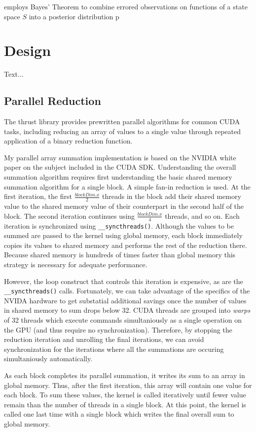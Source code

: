 \documentclass{article}
\begin{document}
 employs Bayes' Theorem to combine errored observations on functions of a state space \(S\) into a posterior distribution p

\section{Design}
Text...
\subsection{Parallel Reduction}
The thrust library provides prewritten parallel algorithms for common CUDA tasks, including reducing an array of values to a single value through repeated application of a binary reduction function.\cite{thrust}

My parallel array summation implementation is based on the NVIDIA white paper on the subject included in the CUDA SDK.\cite{oprc} Understanding the overall summation algorithm requires first understanding the basic shared memory summation algorithm for a single block. A simple fan-in reduction is used. At the first iteration, the first \(\frac{blockDim.x}{2}\) threads in the block add their shared memory value to the shared memory value of their counterpart in the second half of the block. The second iteration continues using \(\frac{blockDim.x}{4}\) threads, and so on. Each iteration is synchronized using \verb!__syncthreads()!. Although the values to be summed are passed to the kernel using global memory, each block immediately copies its values to shared memory and performs the rest of the reduction there. Because shared memory is hundreds of times faster than global memory\cite{tutorial1} this strategy is necessary for adequate performance.

However, the loop construct that controls this iteration is expensive, as are the \verb!__syncthreads()! calls. Fortunately, we can take advantage of the specifics of the NVIDA hardware to get substatial additional savings once the number of values in shared memory to sum drops below 32. CUDA threads are grouped into \emph{warps} of 32 threads which execute commands simultaniously as a single operation on the GPU (and thus require no synchronization). Therefore, by stopping the reduction iteration and unrolling the final iterations, we can avoid synchronization for the iterations where all the summations are occuring simultaniously automatically.

As each block completes its parallel summation, it writes its sum to an array in global memory. Thus, after the first iteration, this array will contain one value for each block. To sum these values, the kernel is called iteratively until fewer value remain than the number of threads in a single block. At this point, the kernel is called one last time with a single block which writes the final overall sum to global memory.
\end{document}
